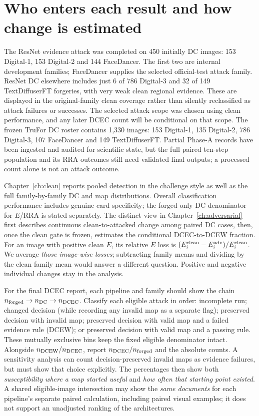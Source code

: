\section{Who enters each result and how change is estimated}
\label{sec:method-analysis}

The ResNet evidence attack was completed on 450 initially DC images: 153 Digital-1, 153 Digital-2 and 144 FaceDancer. The first two are internal development families; FaceDancer supplies the selected official-test attack family. ResNet DC elsewhere includes just 6 of 786 Digital-3 and 32 of 149 TextDiffuserFT forgeries, with very weak clean regional evidence. These are displayed in the original-family clean coverage rather than silently reclassified as attack failures or successes. The selected attack scope was chosen using clean performance, and any later DCEC count will be conditional on that scope. The frozen TruFor DC roster contains 1,330 images: 153 Digital-1, 135 Digital-2, 786 Digital-3, 107 FaceDancer and 149 TextDiffuserFT. Partial Phase-A records have been ingested and audited for scientific state, but the full paired ten-step population and its RRA outcomes still need validated final outputs; a processed count alone is not an attack outcome.

Chapter~\ref{ch:clean} reports pooled detection in the challenge style as well as the full family-by-family DC and map distributions. Overall classification performance includes genuine-card specificity; the forged-only DC denominator for $E$/RRA is stated separately. The distinct view in Chapter~\ref{ch:adversarial} first describes continuous clean-to-attacked change among paired DC cases, then, once the clean gate is frozen, estimates the conditional DCEC-to-DCEW fraction. For an image with positive clean $E$, its relative $E$ loss is $(E_i^{\rm clean}-E_i^{\rm adv})/E_i^{\rm clean}$. We average \emph{those image-wise losses}; subtracting family means and dividing by the clean family mean would answer a different question. Positive and negative individual changes stay in the analysis.

For the final DCEC report, each pipeline and family should show the chain $n_{\rm forged}\rightarrow n_{\rm DC}\rightarrow n_{\rm DCEC}$. Classify each eligible attack in order: incomplete run; changed decision (while recording any invalid map as a separate flag); preserved decision with invalid map; preserved decision with valid map and a failed evidence rule (DCEW); or preserved decision with valid map and a passing rule. These mutually exclusive bins keep the fixed eligible denominator intact. Alongside $n_{\rm DCEW}/n_{\rm DCEC}$, report $n_{\rm DCEC}/n_{\rm forged}$ and the absolute counts. A sensitivity analysis can count decision-preserved invalid maps as evidence failures, but must show that choice explicitly. The percentages then show both \emph{susceptibility where a map started useful} and \emph{how often that starting point existed}. A shared eligible-image intersection may show the \emph{same documents} for each pipeline's separate paired calculation, including paired visual examples; it does not support an unadjusted ranking of the architectures.

